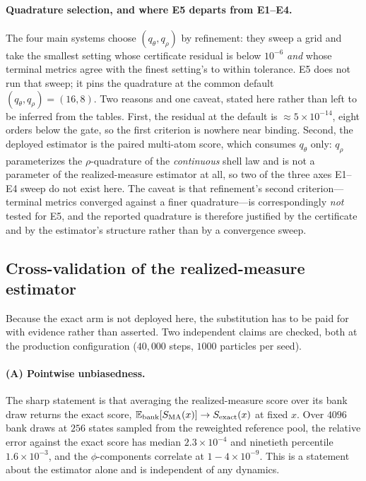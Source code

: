 \documentclass[11pt]{article}
\newcommand{\E}{\mathbb{E}}
\begin{document}
\paragraph{Quadrature selection, and where E5 departs from E1--E4.}
The four main systems choose $(q_\theta,q_\rho)$ by refinement: they sweep a
grid and take the smallest setting whose certificate residual is below
$10^{-6}$ \emph{and} whose terminal metrics agree with the finest setting's to
within tolerance.  E5 does not run that sweep; it pins the quadrature at the
common default $(q_\theta,q_\rho)=(16,8)$.  Two reasons and one caveat, stated
here rather than left to be inferred from the tables.  First, the residual at
the default is $\approx5\times10^{-14}$, eight orders below the gate, so the
first criterion is nowhere near binding.  Second, the deployed estimator is the
paired multi-atom score, which consumes $q_\theta$ only: $q_\rho$ parameterizes
the $\rho$-quadrature of the \emph{continuous} shell law and is not a parameter
of the realized-measure estimator at all, so two of the three axes E1--E4 sweep
do not exist here.  The caveat is that refinement's second criterion---terminal
metrics converged against a finer quadrature---is correspondingly \emph{not}
tested for E5, and the reported quadrature is therefore justified by the
certificate and by the estimator's structure rather than by a convergence
sweep.

\subsection{Cross-validation of the realized-measure estimator}
\label{app:e5-xval}

Because the exact arm is not deployed here, the substitution has to be paid for
with evidence rather than asserted.  Two independent claims are checked, both at
the production configuration ($40{,}000$ steps, $1000$ particles per seed).

\paragraph{(A) Pointwise unbiasedness.}
The sharp statement is that averaging the realized-measure score over its bank
draw returns the exact score, $\E_{\rm bank}[S_{\rm MA}(x)]\to S_{\rm exact}(x)$
at fixed $x$.  Over $4096$ bank draws at $256$ states sampled from the
reweighted reference pool, the relative error against the exact score has median
$2.3\times10^{-4}$ and ninetieth percentile $1.6\times10^{-3}$, and the
$\phi$-components correlate at $1-4\times10^{-9}$.  This is a statement about the
estimator alone and is independent of any dynamics.
\end{document}
